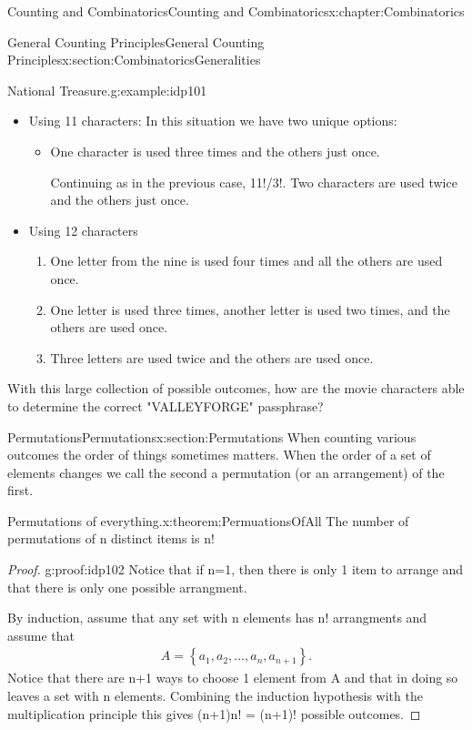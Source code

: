 \documentclass[oneside,10pt,]{book}
\numberwithin{equation}{section}
\begin{document}
\begin{chapterptx}{Counting and Combinatorics}{}{Counting and Combinatorics}{}{}{x:chapter:Combinatorics}
\begin{sectionptx}{General Counting Principles}{}{General Counting Principles}{}{}{x:section:CombinatoricsGeneralities}
\begin{example}{National Treasure.}{g:example:idp101}
\begin{itemize}[label=\textbullet]
\item{}Using 11 characters: In this situation we have two unique options:%
\begin{itemize}[label=$\circ$]
\item{}One character is used three times and the others just once.%
\par
Continuing as in the previous case, 11!\slash{}3!.%
Two characters are used twice and the others just once.\end{itemize}
%
\item{}Using 12 characters%
%
\begin{enumerate}
\item{}One letter from the nine is used four times and all the others are used once.%
\item{}One letter is used three times, another letter is used two times, and the others are used once.%
\item{}Three letters are used twice and the others are used once.%
\end{enumerate}
\end{itemize}
%
\par
With this large collection of possible outcomes, how are the movie characters able to determine the correct "VALLEYFORGE" passphrase?%
\end{example}
\end{sectionptx}
%
%
\typeout{************************************************}
\typeout{************************************************}
%
\begin{sectionptx}{Permutations}{}{Permutations}{}{}{x:section:Permutations}
When counting various outcomes the order of things sometimes matters. When the order of a set of elements changes we call the second a permutation (or an arrangement) of the first.%
\begin{theorem}{Permutations of everything.}{}{x:theorem:PermuationsOfAll}%
The number of permutations of n distinct items is n!%
\end{theorem}
\begin{proof}{}{g:proof:idp102}
Notice that if n=1, then there is only 1 item to arrange and that there is only one possible arrangment.%
\par
By induction, assume that any set with n elements has n! arrangments and assume that%
\begin{gather*}
A = \left \{ a_1, a_2, ... , a_n, a_{n+1} \right \}.
\end{gather*}
Notice that there are n+1 ways to choose 1 element from A and that in doing so leaves a set with n elements. Combining the induction hypothesis with the multiplication principle this gives (n+1)n! = (n+1)! possible outcomes.%

\end{proof}
\end{sectionptx}
\end{chapterptx}
\end{document}
